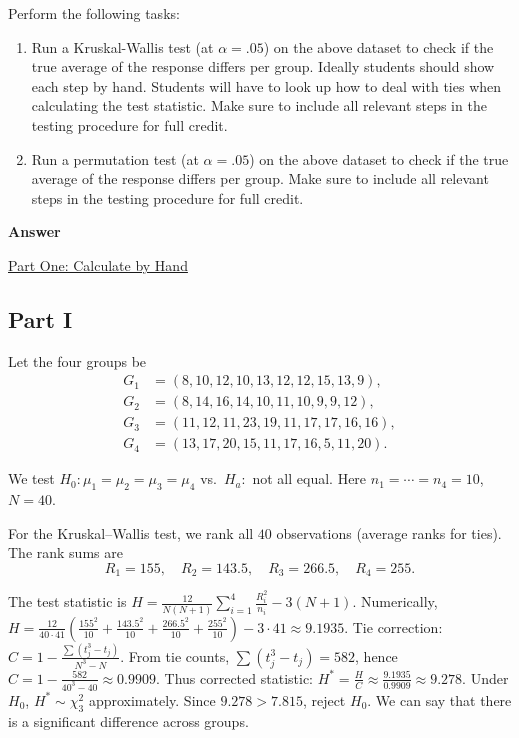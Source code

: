\documentclass[letterpaper]{article}
\begin{document}
		Perform the following tasks:
		\begin{enumerate}
			\item[(i)] Run a Kruskal-Wallis test (at $\alpha=.05$) on the above dataset to check if the true average of the response differs per group. Ideally students should show each step by hand. Students will have to look up how to deal with ties when calculating the test statistic. Make sure to include all relevant steps in the testing procedure for full credit.
			
			\item[(ii)] Run a permutation test (at $\alpha=.05$) on the above dataset to check if the true average of the response differs per group. Make sure to include all relevant steps in the testing procedure for full credit.
		\end{enumerate}
		
		\textbf{Answer}
		
		
		\underline{Part One: Calculate by Hand}
		
		\subsection{Part I}
		Let the four groups be
		\[
		\begin{aligned}
			G_1&=(8,10,12,10,13,12,12,15,13,9),\\
			G_2&=(8,14,16,14,10,11,10,9,9,12),\\
			G_3&=(11,12,11,23,19,11,17,17,16,16),\\
			G_4&=(13,17,20,15,11,17,16,5,11,20).
		\end{aligned}
		\]
		
		We test $H_0:\mu_1=\mu_2=\mu_3=\mu_4$ vs.\ $H_a:$ not all equal. Here $n_1=\cdots=n_4=10$, $N=40$.
		
	 For the {Kruskal--Wallis test}, we rank all $40$ observations (average ranks for ties). The rank sums are
			\[
			R_1=155,\quad R_2=143.5,\quad R_3=266.5,\quad R_4=255.
			\]
			
			The test statistic is 
			$H=\frac{12}{N(N+1)}\sum_{i=1}^4 \frac{R_i^2}{n_i}-3(N+1)$. Numerically,
			$H=\frac{12}{40\cdot 41}\left(\frac{155^2}{10}+\frac{143.5^2}{10}+\frac{266.5^2}{10}+\frac{255^2}{10}\right)-3\cdot 41\approx 9.1935$.
			Tie correction: $C=1-\frac{\sum (t_j^3-t_j)}{N^3-N}$.
			From tie counts, $\sum (t_j^3-t_j)=582$, hence
			$C=1-\frac{582}{40^3-40}\approx 0.9909$. Thus corrected statistic:
			$H^\ast=\frac{H}{C}\approx \frac{9.1935}{0.9909}\approx 9.278$.
			Under $H_0$, $H^\ast\sim \chi^2_3$ approximately. Since $9.278>7.815$, reject $H_0$. We can say that there is a significant difference across groups.
			
\end{document}
